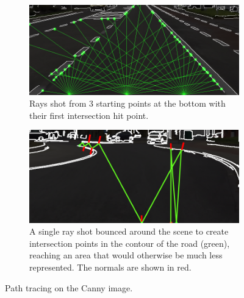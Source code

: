 \documentclass[oneside,english]{llncs}
\begin{document}
\begin{figure}
    \centering
    \begin{subfigure}[t]{0.46\textwidth}
        \centering
        \includegraphics[width=1\textwidth]{lanedetector_rays}
        \caption{Rays shot from 3 starting points at the bottom with their first intersection hit point.}
        \label{fig:Rays-shot-from}
    \end{subfigure}
    \hfill
    \begin{subfigure}[t]{0.46\textwidth}
        \centering
        \includegraphics[width=1\textwidth]{lanedetector_reflection}
        \caption{A single ray shot bounced around the scene to create intersection points in the contour of the road (green), reaching an area that would otherwise be much less represented. The normals are shown in red.}
        \label{fig:A-single-ray}
    \end{subfigure}%
\caption{Path tracing on the Canny image.}
\vspace{-2em} %
\end{figure}
\end{document}

